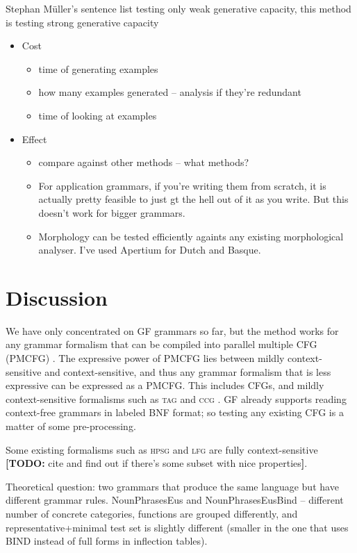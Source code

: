 \documentclass[11pt]{article}
\def\lfg{\textsc{lfg}}
\def\ccg{\textsc{ccg}}
\def\tag{\textsc{tag}}
\def\hpsg{\textsc{hpsg}}
\newcommand{\todo}[1]{{\color{cyan}\textbf{[TODO: }#1\textbf{]}}}
\begin{document}
Stephan Müller's sentence list testing only weak generative capacity,
this method is testing strong generative capacity


\begin{itemize}
\item Cost
  \begin{itemize}
  \item time of generating examples
  \item how many examples generated -- analysis if they're redundant
  \item time of looking at examples
  \end{itemize}

\item Effect
  \begin{itemize}
  \item compare against other methods -- what methods?
  \item For application grammars, if you're writing them from scratch, it is actually pretty feasible to just gt the hell out of it as you write. But this doesn't work for bigger grammars.
  \item Morphology can be tested efficiently againts any existing morphological analyser. I've used Apertium for Dutch and Basque.
  \end{itemize}
\end{itemize}


\section{Discussion}

We have only concentrated on GF grammars so far, but the method works
for any grammar formalism that can be compiled into parallel
multiple CFG (PMCFG) \cite{seki91pmcfg}. The expressive power of PMCFG lies
between mildly context-sensitive and context-sensitive, and thus any
grammar formalism that is less expressive can be expressed as a
PMCFG. This includes CFGs, and mildly context-sensitive formalisms
such as \tag{} \cite{joshi1975tag} and \ccg{} \cite{steedman1988ccg}. GF
already supports reading context-free grammars in labeled BNF format;
so testing any existing CFG is a matter of some pre-processing.

Some existing formalisms such as \hpsg{} and \lfg{} are fully
context-sensitive \todo{cite and find out if there's some subset with
  nice properties}.


Theoretical question: two grammars that produce the same language but
have different grammar rules.
NounPhrasesEus and NounPhrasesEusBind -- different number of concrete
categories, functions are grouped differently, and
representative+minimal test set is slightly different (smaller in the
one that uses BIND instead of full forms in inflection tables).
\end{document}
